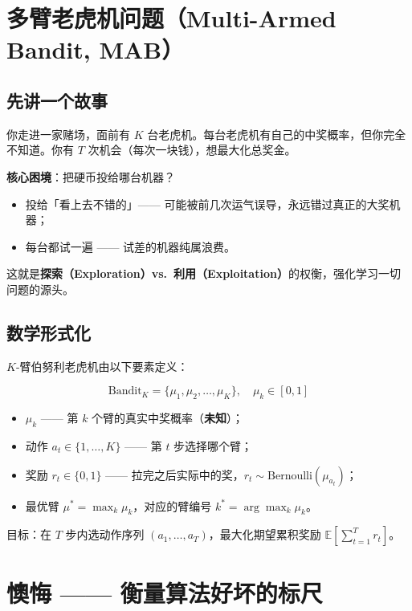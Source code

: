 \documentclass{article}
\begin{document}
\section*{多臂老虎机问题（Multi-Armed Bandit, MAB）}

\subsection*{先讲一个故事}

你走进一家赌场，面前有 $K$ 台老虎机。每台老虎机有自己的中奖概率，但你完全不知道。你有 $T$ 次机会（每次一块钱），想最大化总奖金。

\textbf{核心困境}：把硬币投给哪台机器？
\begin{itemize}
  \item 投给「看上去不错的」—— 可能被前几次运气误导，永远错过真正的大奖机器；
  \item 每台都试一遍 —— 试差的机器纯属浪费。
\end{itemize}

这就是\textbf{探索（Exploration）vs.\ 利用（Exploitation）}的权衡，强化学习一切问题的源头。

\subsection*{数学形式化}

$K$-臂伯努利老虎机由以下要素定义：

\[
\boxed{\text{Bandit}_K = \{\mu_1, \mu_2, \ldots, \mu_K\}, \quad \mu_k \in [0,1]}
\]

\begin{itemize}
  \item $\mu_k$ —— 第 $k$ 个臂的真实中奖概率（\textbf{未知}）；
  \item 动作 $a_t \in \{1,\ldots,K\}$ —— 第 $t$ 步选择哪个臂；
  \item 奖励 $r_t \in \{0,1\}$ —— 拉完之后实际中的奖，$r_t \sim \text{Bernoulli}(\mu_{a_t})$；
  \item 最优臂 $\mu^* = \max_k \mu_k$，对应的臂编号 $k^* = \arg\max_k \mu_k$。
\end{itemize}

目标：在 $T$ 步内选动作序列 $(a_1,\ldots,a_T)$，最大化期望累积奖励 $\mathbb{E}\left[\sum_{t=1}^{T} r_t\right]$。

\section*{懊悔 —— 衡量算法好坏的标尺}
\end{document}
